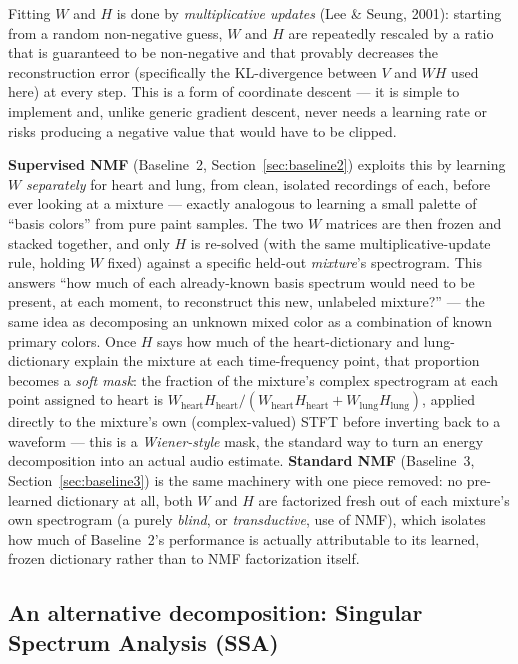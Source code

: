 \documentclass[11pt]{article}
\begin{document}
Fitting $W$ and $H$ is done by \emph{multiplicative updates} (Lee \&
Seung, 2001): starting from a random non-negative guess, $W$ and $H$ are
repeatedly rescaled by a ratio that is guaranteed to be non-negative and
that provably decreases the reconstruction error (specifically the
KL-divergence between $V$ and $WH$ used here) at every step. This is a
form of coordinate descent --- it is simple to implement and, unlike
generic gradient descent, never needs a learning rate or risks producing a
negative value that would have to be clipped.

\textbf{Supervised NMF} (Baseline~2, Section~\ref{sec:baseline2}) exploits
this by learning $W$ \emph{separately} for heart and lung, from clean,
isolated recordings of each, before ever looking at a mixture --- exactly
analogous to learning a small palette of ``basis colors'' from pure paint
samples. The two $W$ matrices are then frozen and stacked together, and
only $H$ is re-solved (with the same multiplicative-update rule, holding
$W$ fixed) against a specific held-out \emph{mixture}'s spectrogram. This
answers ``how much of each already-known basis spectrum would need to be
present, at each moment, to reconstruct this new, unlabeled mixture?'' ---
the same idea as decomposing an unknown mixed color as a combination of
known primary colors. Once $H$ says how much of the heart-dictionary and
lung-dictionary explain the mixture at each time-frequency point, that
proportion becomes a \emph{soft mask}: the fraction of the mixture's
complex spectrogram at each point assigned to heart is
$W_{\text{heart}}H_{\text{heart}} /
(W_{\text{heart}}H_{\text{heart}}+W_{\text{lung}}H_{\text{lung}})$, applied
directly to the mixture's own (complex-valued) STFT before inverting back
to a waveform --- this is a \emph{Wiener-style} mask, the standard way to
turn an energy decomposition into an actual audio estimate. \textbf{Standard
NMF} (Baseline~3, Section~\ref{sec:baseline3}) is the same machinery with
one piece removed: no pre-learned dictionary at all, both $W$ and $H$ are
factorized fresh out of each mixture's own spectrogram (a purely
\emph{blind}, or \emph{transductive}, use of NMF), which isolates how much
of Baseline~2's performance is actually attributable to its learned,
frozen dictionary rather than to NMF factorization itself.

\subsection{An alternative decomposition: Singular Spectrum Analysis (SSA)}
\label{sec:bg-ssa}
\end{document}
